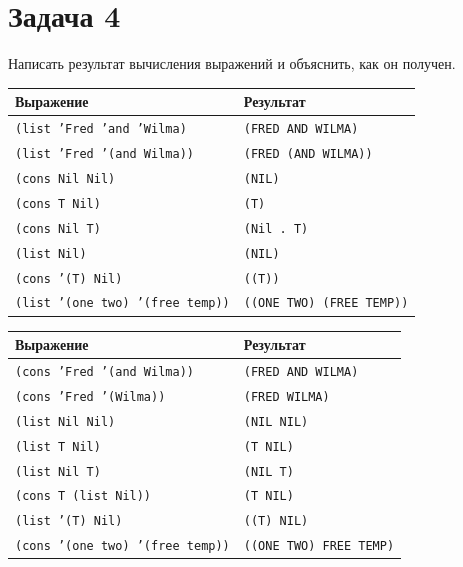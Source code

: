 \section{Задача 4}

Написать результат вычисления выражений и объяснить, как он получен.

\begin{table}
	\begin{center}
		\begin{tabular}{|l|l|}
			\hline
			\textbf{Выражение} & \textbf{Результат} \\
			\hline
			\texttt{(list 'Fred 'and 'Wilma)} & \texttt{(FRED AND WILMA)} \\
			\hline
			\texttt{(list 'Fred '(and Wilma))} & \texttt{(FRED (AND WILMA))} \\
			\hline
			\texttt{(cons Nil Nil)} & \texttt{(NIL)} \\
			\hline
			\texttt{(cons T Nil)} & \texttt{(T)} \\
			\hline
			\texttt{(cons Nil T)} & \texttt{(Nil . T)} \\
			\hline
			\texttt{(list Nil)} & \texttt{(NIL)} \\
			\hline
			\texttt{(cons '(T) Nil)} & \texttt{((T))} \\
			\hline
			\texttt{(list '(one two) '(free temp))} & \texttt{((ONE TWO) (FREE TEMP))} \\
			\hline
		\end{tabular}
	\end{center}
\end{table}

\clearpage

\begin{table}[ht]
	\begin{center}
		\begin{tabular}{|l|l|}
			\hline
			\textbf{Выражение} & \textbf{Результат} \\
			\hline			
			\texttt{(cons 'Fred '(and Wilma))} & \texttt{(FRED AND WILMA)} \\
			\hline
			\texttt{(cons 'Fred '(Wilma))} & \texttt{(FRED WILMA)} \\
			\hline
			\texttt{(list Nil Nil)} & \texttt{(NIL NIL)} \\
			\hline
			\texttt{(list T Nil)} & \texttt{(T NIL)} \\
			\hline
			\texttt{(list Nil T)} & \texttt{(NIL T)} \\
			\hline
			\texttt{(cons T (list Nil))} & \texttt{(T NIL)} \\
			\hline
			\texttt{(list '(T) Nil)} & \texttt{((T) NIL)} \\
			\hline
			\texttt{(cons '(one two) '(free temp))} & \texttt{((ONE TWO) FREE TEMP)} \\
			\hline
		\end{tabular}
	\end{center}
\end{table}

